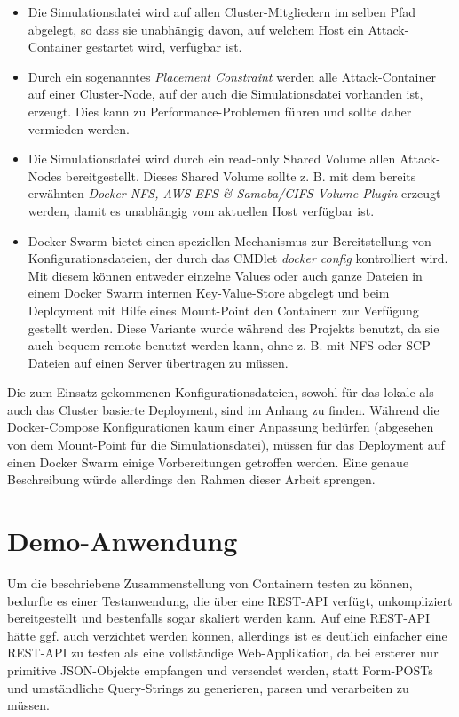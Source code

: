 \begin{itemize}
	\item Die Simulationsdatei wird auf allen Cluster-Mitgliedern im selben Pfad abgelegt, so dass sie unabh\"angig davon, auf welchem Host ein Attack-Container gestartet wird, verf\"ugbar ist.
	\item Durch ein sogenanntes \textit{Placement Constraint} werden alle Attack-Container auf einer Cluster-Node, auf der auch die Simulationsdatei vorhanden ist, erzeugt. Dies kann zu Performance-Problemen f\"uhren und sollte daher vermieden werden.
	\item Die Simulationsdatei wird durch ein read-only Shared Volume allen Attack-Nodes bereitgestellt. Dieses Shared Volume sollte z. B. mit dem bereits erw\"ahnten \textit{Docker NFS, AWS EFS \& Samaba/CIFS Volume Plugin} erzeugt werden, damit es unabh\"angig vom aktuellen Host verf\"ugbar ist.
	\item Docker Swarm bietet einen speziellen Mechanismus zur Bereitstellung von Konfigurationsdateien, der durch das CMDlet \textit{docker config} kontrolliert wird. Mit diesem k\"onnen entweder einzelne Values oder auch ganze Dateien in einem Docker Swarm internen Key-Value-Store abgelegt und beim Deployment mit Hilfe eines Mount-Point den Containern zur Verf\"ugung gestellt werden. Diese Variante wurde w\"ahrend des Projekts benutzt, da sie auch bequem remote benutzt werden kann, ohne z. B. mit NFS oder SCP Dateien auf einen Server \"ubertragen zu m\"ussen.
\end{itemize}

Die zum Einsatz gekommenen Konfigurationsdateien, sowohl f\"ur das lokale als auch das Cluster basierte Deployment, sind im Anhang zu finden.
W\"ahrend die Docker-Compose Konfigurationen kaum einer Anpassung bed\"urfen (abgesehen von dem Mount-Point f\"ur die Simulationsdatei), m\"ussen f\"ur das Deployment auf einen Docker Swarm einige Vorbereitungen getroffen werden.
Eine genaue Beschreibung w\"urde allerdings den Rahmen dieser Arbeit sprengen.

\section{Demo-Anwendung}

Um die beschriebene Zusammenstellung von Containern testen zu k\"onnen, bedurfte es einer Testanwendung, die \"uber eine REST-API verf\"ugt, unkompliziert bereitgestellt und bestenfalls sogar skaliert werden kann.
Auf eine REST-API h\"atte ggf. auch verzichtet werden k\"onnen, allerdings ist es deutlich einfacher eine REST-API zu testen als eine vollst\"andige Web-Applikation, da bei ersterer nur primitive JSON-Objekte empfangen und versendet werden, statt Form-POSTs und umst\"andliche Query-Strings zu generieren, parsen und verarbeiten zu m\"ussen.

